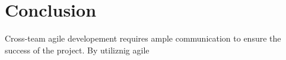 \section{Conclusion}
Cross-team agile developement requires ample communication to ensure the success of the project.
By utiliznig agile 
